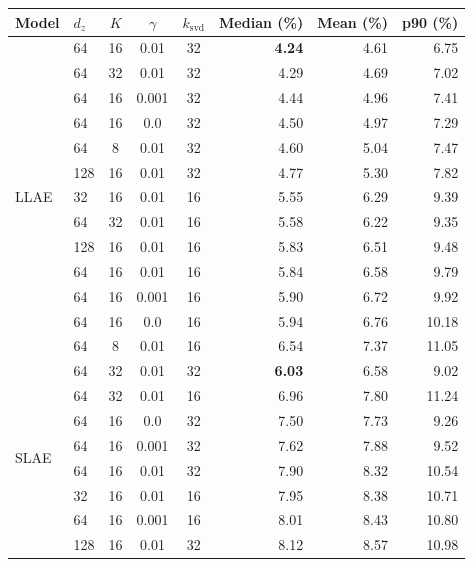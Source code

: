 ﻿\documentclass[a4paper,12pt]{article}
\theoremstyle{definition}
\theoremstyle{remark}
\begin{document}
\begin{table}[htbp]
    \centering
    \small
    \setlength{\tabcolsep}{5pt}
    \renewcommand{\arraystretch}{1.3}
    \begin{tabular}{llcccrrr}
        \toprule
        \textbf{Model} & $d_z$ & $K$ & $\gamma$ & $k_{\mathrm{svd}}$
            & \textbf{Median (\%)} & \textbf{Mean (\%)} & \textbf{p90 (\%)} \\
        \midrule
        \multirow{13}{*}{LLAE}
          & 64  & 16 & 0.01  & 32 & \textbf{4.24} & 4.61 & 6.75 \\
          & 64  & 32 & 0.01  & 32 & 4.29 & 4.69 & 7.02 \\
          & 64  & 16 & 0.001 & 32 & 4.44 & 4.96 & 7.41 \\
          & 64  & 16 & 0.0   & 32 & 4.50 & 4.97 & 7.29 \\
          & 64  &  8 & 0.01  & 32 & 4.60 & 5.04 & 7.47 \\
          & 128 & 16 & 0.01  & 32 & 4.77 & 5.30 & 7.82 \\
          & 32  & 16 & 0.01  & 16 & 5.55 & 6.29 & 9.39 \\
          & 64  & 32 & 0.01  & 16 & 5.58 & 6.22 & 9.35 \\
          & 128 & 16 & 0.01  & 16 & 5.83 & 6.51 & 9.48 \\
          & 64  & 16 & 0.01  & 16 & 5.84 & 6.58 & 9.79 \\
          & 64  & 16 & 0.001 & 16 & 5.90 & 6.72 & 9.92 \\
          & 64  & 16 & 0.0   & 16 & 5.94 & 6.76 & 10.18 \\
          & 64  &  8 & 0.01  & 16 & 6.54 & 7.37 & 11.05 \\
        \midrule
        \multirow{13}{*}{SLAE}
          & 64  & 32 & 0.01  & 32 & \textbf{6.03} & 6.58 & 9.02 \\
          & 64  & 32 & 0.01  & 16 & 6.96 & 7.80 & 11.24 \\
          & 64  & 16 & 0.0   & 32 & 7.50 & 7.73 & 9.26 \\
          & 64  & 16 & 0.001 & 32 & 7.62 & 7.88 & 9.52 \\
          & 64  & 16 & 0.01  & 32 & 7.90 & 8.32 & 10.54 \\
          & 32  & 16 & 0.01  & 16 & 7.95 & 8.38 & 10.71 \\
          & 64  & 16 & 0.001 & 16 & 8.01 & 8.43 & 10.80 \\
          & 128 & 16 & 0.01  & 32 & 8.12 & 8.57 & 10.98 \\

\end{tabular}
\end{table}
\end{document}
